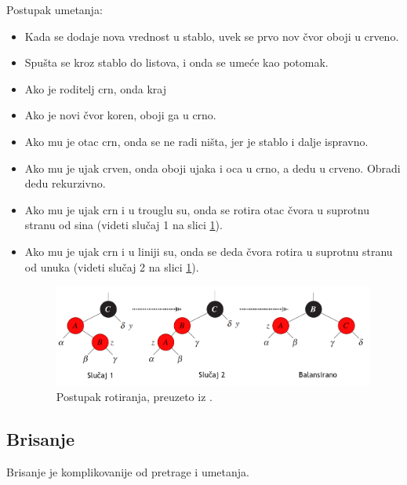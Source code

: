 \documentclass[a4paper]{article}
\begin{document}
    Postupak umetanja:
    \begin{itemize}

    \item Kada se dodaje nova vrednost u stablo, uvek se prvo nov čvor oboji u crveno.
    \item Spušta se kroz stablo do listova, i onda se umeće kao potomak.

    \item Ako je roditelj crn, onda kraj

   \item Ako je novi čvor koren, oboji ga u crno.
   \item Ako mu je otac crn, onda se ne radi ništa, jer je stablo i dalje ispravno.
   \item Ako mu je ujak crven, onda oboji ujaka i oca u crno, a dedu u crveno. Obradi dedu rekurzivno.
   \item Ako mu je ujak crn i u trouglu su, onda se rotira otac čvora u suprotnu stranu od sina (videti slučaj 1 na slici \ref{fig:rotation}).
   \item Ako mu je ujak crn i u liniji su, onda se deda čvora rotira u suprotnu stranu od unuka (videti slučaj 2 na slici \ref{fig:rotation}).

    \begin{figure}[h!]
        \begin{center}
        \includegraphics[scale=0.26]{rotation.png}
        \end{center}
        \caption{Postupak rotiranja, preuzeto iz \cite{clrs}.}
        \label{fig:rotation}
    \end{figure}

\end{itemize}

\subsection{Brisanje}
Brisanje je komplikovanije od pretrage i umetanja.
\end{document}
